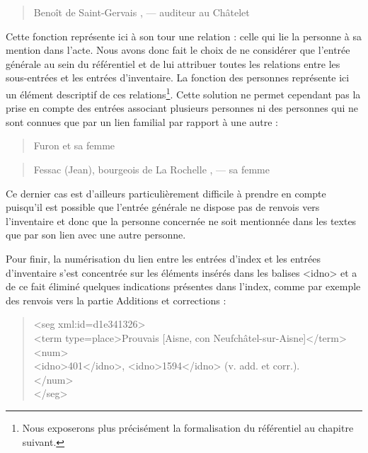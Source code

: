 \documentclass[a4paper,12pt,twoside]{book}
\begin{document}
	\begin{quotation}
		Benoît de Saint-Gervais , — auditeur au Châtelet
	\end{quotation}
	
	Cette fonction représente ici à son tour une relation : celle qui lie la personne à sa mention dans l'acte. Nous avons donc fait le choix de ne considérer que l'entrée générale au sein du référentiel et de lui attribuer toutes les relations entre les sous-entrées et les entrées d'inventaire. La fonction des personnes représente ici un élément descriptif de ces relations\footnote{Nous exposerons plus précisément la formalisation du référentiel au chapitre suivant.}. Cette solution ne permet cependant pas la prise en compte des entrées associant plusieurs personnes ni des personnes qui ne sont connues que par un lien familial par rapport à une autre :
	
	\begin{quotation}
		Furon et sa femme
	\end{quotation}

	\begin{quotation}
		Fessac (Jean), bourgeois de La Rochelle , — sa femme
	\end{quotation}

	\noindent Ce dernier cas est d'ailleurs particulièrement difficile à prendre en compte puisqu'il est possible que l'entrée générale ne dispose pas de renvois vers l'inventaire et donc que la personne concernée ne soit mentionnée dans les textes que par son lien avec une autre personne.
	
	Pour finir, la numérisation du lien entre les entrées d'index et les entrées d'inventaire s'est concentrée sur les éléments insérés dans les balises <idno> et a de ce fait éliminé quelques indications présentes dans l'index, comme par exemple des renvois vers la partie \og Additions et corrections\fg{} :
	
	\pagebreak
	
	\begin{quotation}
		<seg xml:id=\textquotesingle d1e341326\textquotesingle >\\
		\indent\indent<term type=\textquotesingle place\textquotesingle >Prouvais [Aisne, con Neufchâtel-sur-Aisne]</term>\\
		\indent\indent<num>\\
		\indent\indent{}401</idno>, <idno>1594</idno> (v. add. et corr.).\\
		\indent{}\\
		\\
	\end{quotation}
	
\end{document}
